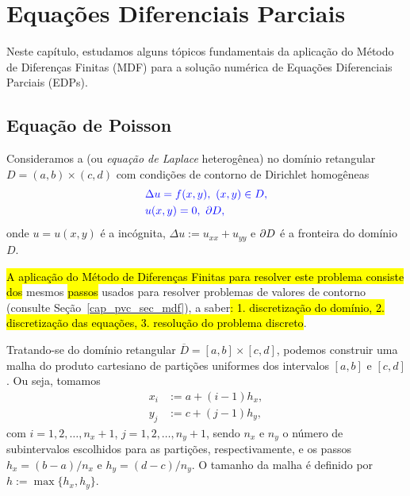 
\chapter{Equações Diferenciais Parciais}\label{cap_edp}
\thispagestyle{fancy}

Neste capítulo, estudamos alguns tópicos fundamentais da aplicação do Método de Diferenças Finitas (MDF) para a solução numérica de Equações Diferenciais Parciais (EDPs).

\section{Equação de Poisson}\label{cap_edp_sec_poisson}

Consideramos a  (ou \emph{equação de Laplace}{\laplace} heterogênea) no domínio retangular $D = (a, b)\times (c, d)$ com condições de contorno de Dirichlet homogêneas
\begin{subequations}\label{cap_edp_sec_poisson:eq:prob}\hleq
  \begin{align}
    &\Delta u = f(x, y), ~(x, y)\in D, \label{cap_edp_sec_poisson:eq:prob_eq}\\
    &u(x,y) = 0, ~\p D,\label{cap_edp_sec_poisson:eq:prob_bc}
  \end{align}
\end{subequations}
onde $u = u(x,y)$ é a incógnita, $\Delta u := u_{xx} + u_{yy}$ e $\partial D$ é a fronteira do domínio $D$.

\hl{A aplicação do Método de Diferenças Finitas para resolver este problema consiste dos} mesmos \hl{passos} usados para resolver problemas de valores de contorno (consulte Seção~\ref{cap_pvc_sec_mdf}), a saber\hl{: 1. discretização do domínio, 2. discretização das equações, 3. resolução do problema discreto}.

\begin{flushleft}
\end{flushleft}

Tratando-se do domínio retangular $\overline{D} = [a, b]\times [c, d]$, podemos construir uma malha do produto cartesiano de partições uniformes dos intervalos $[a, b]$ e $[c, d]$. Ou seja, tomamos
\begin{subequations}
  \begin{align}
    x_{i} &:= a + (i-1)h_x,\\
    y_{j} &:= c + (j-1)h_y,  
\end{align}
\end{subequations}
com $i = 1, 2, \dotsc, n_x+1$, $j = 1, 2, \dotsc, n_y+1$, sendo $n_x$ e $n_y$ o número de subintervalos escolhidos para as partições, respectivamente, e os passos $h_x = (b-a)/n_x$ e $h_y=(d-c)/n_y$. O tamanho da malha é definido por $h := \max\{h_x, h_y\}$.

